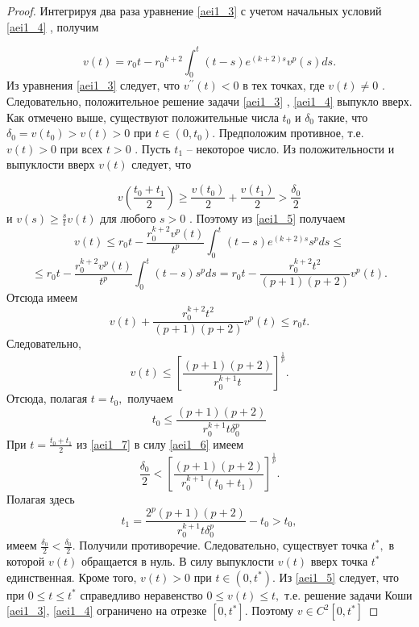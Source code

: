 \begin{proof}

Интегрируя два раза уравнение \eqref{aei1_3}
 с учетом начальных условий \eqref{aei1_4} , получим

\begin{equation}\label{aei1_5}
v(t)=r_0t-{r_0}^{k+2} \int_0^t(t-s)e^{(k+2)s}v^p(s)ds.
\end{equation}
Из уравнения \eqref{aei1_3}  следует, что $ v^{\prime\prime}(t)<0 $ в тех
точках, где $ v(t) \neq 0 $ .
Следовательно, положительное решение
задачи \eqref{aei1_3} , \eqref{aei1_4}  выпукло вверх. Как отмечено выше, существуют
положительные числа $ t_0 $ и $ \delta_0 $ такие, что $
\delta_0=v(t_0)>v(t)>0 $  при $ t \in (0,t_0)$. Предположим
противное, т.е. $ v(t)>0 $  при всех $ t>0 $ . Пусть $ t_1$ --
некоторое число. Из положительности и выпуклости вверх $ v(t) $
следует, что

\begin{equation}\label{aei1_6}
 v\left(\frac{t_0+t_1}{2}\right)
\geq \frac{v(t_0)}{2}+\frac{v(t_1)}{2}>\frac{\delta_0}{2}
\end{equation}
и $ v(s) \geq \frac {s}{t}v(t) $ для любого $ s>0 $ .
Поэтому из \eqref{aei1_5} получаем
$$
v(t) \leq r_0t-\frac{r_0^{k+2}v^p(t)}{t^p}
\int_0^t(t-s)e^{(k+2)s}s^pds \leq
$$
$$
 \leq r_0t-\frac{r_0^{k+2}v^p(t)}{t^p}
 \int_0^t(t-s)s^pds=
  r_0t-\frac{r_0^{k+2}t^2}{(p+1)(p+2)}v^p(t).
$$
Отсюда имеем
$$
v(t)+\frac{r_0^{k+2}t^2}{(p+1)(p+2)}v^p(t) \leq r_0t.
$$
Следовательно,
\begin{equation}\label{aei1_7}
v(t)
\leq {\left [\frac {(p+1)(p+2)}{r_0^{k+1}t}\right ]}^
{\frac{1}{p}}.
\end{equation}
Отсюда, полагая $ t=t_0,  $ получаем
$$
t_0 \leq \frac {(p+1)(p+2)}{r_0^{k+1}t\delta_0^p}
$$
При $ t=\frac{t_0+t_1}{2} $ из \eqref{aei1_7} в силу \eqref{aei1_6} имеем
$$
\frac {\delta_0}{2}<
{\left [\frac {(p+1)(p+2)}{r_0^{k+1}(t_0+t_1)}\right ]}^
{\frac{1}{p}}.
$$
Полагая здесь
$$
t_1=\frac {2^p(p+1)(p+2)}{r_0^{k+1}t\delta_0^p}-t_0>t_0,
$$
имеем $ \frac{\delta_0}{2}<\frac{\delta_0}{2}$.
Получили противоречие. Следовательно, существует точка $ t^*, $
в которой $ v(t) $ обращается в нуль. В силу выпуклости
$ v(t) $  вверх точка $ t^* $  единственная. Кроме того,
$ v(t)>0 $   при $ t \in (0, t^*) $. Из \eqref{aei1_5} следует, что
 при $ 0 \leq t \leq t^* $  справедливо неравенство
$ 0 \leq v(t) \leq t, $ т.е. решение задачи Коши \eqref{aei1_3}, \eqref{aei1_4}
ограничено на отрезке $ [0, t^*] $. Поэтому $ v \in C^2[0, t^*]$
\end{proof}

